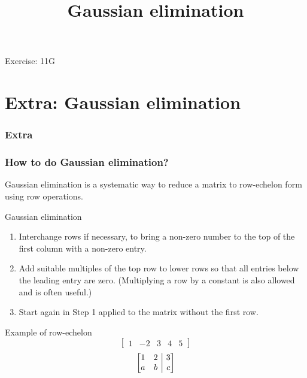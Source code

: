 \documentclass[
	11pt, %
]{beamer}
\makeatletter
\newenvironment{amatrix}[1]{%
  \left[\begin{array}{@{}*{#1}{c}|c@{}}
}{%
  \end{array}\right]
}
\makeatother
\begin{document}
\begin{frame}{Exercise: 11G}
\end{frame}
\section{Extra: Gaussian elimination}
\begin{frame}
    \frametitle{Extra}
    \begin{center}
        \title{Gaussian elimination}
        \maketitle
    \end{center}
\end{frame}

\begin{frame}
    \frametitle{How to do Gaussian elimination?}
    Gaussian elimination is a systematic way to reduce a matrix to row-echelon form using row operations.
    \begin{block}{Gaussian elimination}
        \begin{enumerate}
            \item Interchange rows if necessary, to bring a non-zero number to the top of the first column with a non-zero entry.
            \item Add suitable multiples of the top row to lower rows so that all entries below the leading entry are zero. (Multiplying a row
            by a constant is also allowed and is often useful.)
            \item Start again in Step 1 applied to the matrix without the first row.
        \end{enumerate}
    \end{block}
    \begin{block}{Example of row-echelon}
        \[
        \begin{bmatrix}
            1 & -2 & 3 & 4 & 5
        \end{bmatrix}
        \]
        \[
        \begin{amatrix}{2}
            1 & 2 & 3\\
            a & b & c
        \end{amatrix}
        \]
    \end{block}
\end{frame}
\end{document}
